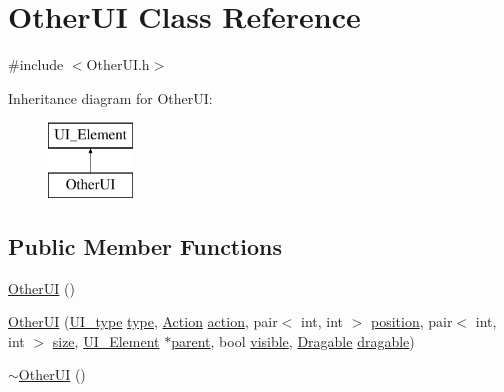 \hypertarget{class_other_u_i}{}\section{Other\+UI Class Reference}
\label{class_other_u_i}


{\ttfamily \#include $<$Other\+U\+I.\+h$>$}

Inheritance diagram for Other\+UI\+:\begin{figure}[H]
\begin{center}
\leavevmode
\includegraphics[height=2.000000cm]{class_other_u_i}
\end{center}
\end{figure}
\subsection*{Public Member Functions}
\begin{DoxyCompactItemize}
\item 
\mbox{\hyperlink{class_other_u_i_a578f422a850cb0bc5823b80b7e56f3f0}{Other\+UI}} ()
\item 
\mbox{\hyperlink{class_other_u_i_a4d919422d92870f71616b2ca50b0ed84}{Other\+UI}} (\mbox{\hyperlink{class_u_i___element_a7ed595c46c75d53d30fa3813b036cf1e}{U\+I\+\_\+type}} \mbox{\hyperlink{class_u_i___element_ad40069673afbc9b0fbd596ef164e8e92}{type}}, \mbox{\hyperlink{class_u_i___element_ae179047d98a379f4e0dcdf0871c7b8d6}{Action}} \mbox{\hyperlink{class_u_i___element_a1d416dd216b21b0cfd8e234edad2b472}{action}}, pair$<$ int, int $>$ \mbox{\hyperlink{class_u_i___element_a47f8f59e3f076f611948eb7aee09d943}{position}}, pair$<$ int, int $>$ \mbox{\hyperlink{class_u_i___element_a6a5d2f29f12914f3806a82c4834746e6}{size}}, \mbox{\hyperlink{class_u_i___element}{U\+I\+\_\+\+Element}} $\ast$\mbox{\hyperlink{class_u_i___element_a3e9ec27fe0cc3d30c351a9405733439f}{parent}}, bool \mbox{\hyperlink{class_u_i___element_a78aac2800a8d8db3ab76caddf3ece0c4}{visible}}, \mbox{\hyperlink{struct_dragable}{Dragable}} \mbox{\hyperlink{class_u_i___element_ac2b4266648ab33c1a486bfa8fd79d474}{dragable}})
\item 
\mbox{\hyperlink{class_other_u_i_a0669d35160c82ae4f4ea81751282c240}{$\sim$\+Other\+UI}} ()
\end{DoxyCompactItemize}
